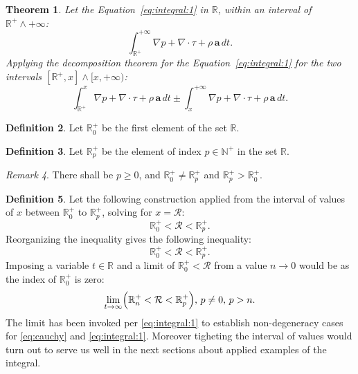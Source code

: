 \documentclass[10pt]{article}
\theoremstyle{plain}
\newtheorem{theorem}{Theorem}[section]
\theoremstyle{definition}
\newtheorem{definition}[theorem]{Definition}
\theoremstyle{remark}
\newtheorem{remark}[theorem]{Remark}
\begin{document}
\begin{theorem}
  \label{ex:1}
  Let the Equation~\ref{eq:integral:1} in $\mathbb{R}$, within an interval of $\mathbb{R}^{+} \land +\infty$:
  \begin{equation}
      \int_{\mathbb{R}^{+}}^{+\infty} \nabla p + \nabla \cdot \tau + \rho \, \textbf{a} \, dt.
  \end{equation}
  Applying the decomposition theorem for the Equation~\ref{eq:integral:1} for the two intervals $[\mathbb{R}^{+}, x] \land [x, +\infty)$:
  \begin{equation}
      \int_{\mathbb{R}^{+}}^{x} \nabla p + \nabla \cdot \tau + \rho \, \textbf{a} \, dt \pm \int_{x}^{+\infty} \nabla p + \nabla \cdot \tau + \rho \, \textbf{a} \, dt.
  \end{equation}
\end{theorem}
\begin{definition}
  Let $\mathbb{R}^{+}_0$ be the first element of the set $\mathbb{R}$.
\end{definition}
\begin{definition}
  Let $\mathbb{R}^{+}_p$ be the element of index $p \in \mathbb{N}^{+}$ in the set $\mathbb{R}$.
\end{definition}
\begin{remark}
  There shall be $p \geq 0$, and $\mathbb{R}^{+}_0 \neq \mathbb{R}^{+}_p $ and $ \mathbb{R}^{+}_p > \mathbb{R}^{+}_0$.
\end{remark}
\begin{definition}
  Let the following construction applied from the interval of values of $x$ between $\mathbb{R}^{+}_0$ to $\mathbb{R}^{+}_{p}$, solving for $x=\mathcal{R}$:
  \begin{equation}
    \mathbb{R}^{+}_0 < \mathcal{R} < \mathbb{R}^{+}_{p}.
  \end{equation}
  Reorganizing the inequality gives the following inequality:
  \begin{equation}
    \mathbb{R}^{+}_0 < \mathcal{R} < \mathbb{R}^{+}_{p}.
  \end{equation}
  Imposing a variable $t \in \mathbb{R}$ and a limit of $\mathbb{R}^{+}_0 < \mathcal{R}$ from a value $n \to 0$ would be as the index of $\mathbb{R}^{+}_0$ is zero:
  \begin{equation}
    \lim_{t \to \infty} \Bigl( \mathbb{R}^{+}_n < \mathcal{R} < \mathbb{R}^{+}_{p} \Bigr), \, p \neq 0, \, p > n.
  \end{equation}
  The limit has been invoked per \ref{eq:integral:1} to establish non-degeneracy cases for \ref{eq:cauchy} and \ref{eq:integral:1}. Moreover tigheting the interval of values would turn out to serve us well in the next sections about applied examples of the integral.
\end{definition}
\end{document}
